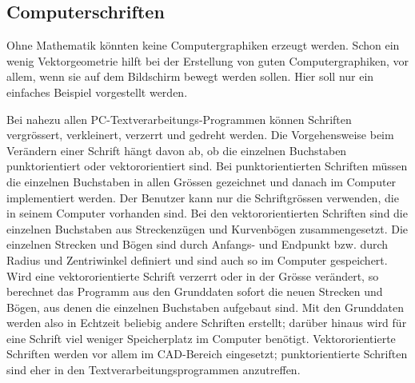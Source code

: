 \documentclass[%
11pt,%
twoside,%
titlepage,%
german,%
headsepline%
]{scrartcl}
\begin{document}
\subsection{Computerschriften}
Ohne Mathematik könnten keine Computergraphiken erzeugt werden. Schon ein wenig Vektorgeometrie hilft bei der Erstellung von guten Computergraphiken, vor allem, wenn sie auf dem Bildschirm bewegt werden sollen.
Hier soll nur ein einfaches Beispiel vorgestellt werden.

Bei nahezu allen PC-Textverarbeitungs-Programmen können Schriften vergrössert, verkleinert, verzerrt und gedreht werden. Die Vorgehensweise beim Verändern einer Schrift hängt davon ab, ob die einzelnen Buchstaben punktorientiert oder vektororientiert sind. Bei punktorientierten Schriften müssen die einzelnen Buchstaben in allen Grössen gezeichnet und danach im Computer implementiert werden. Der Benutzer kann nur die Schriftgrössen verwenden, die in seinem Computer vorhanden sind. Bei den vektororientierten Schriften sind die einzelnen Buchstaben aus Streckenzügen und Kurvenbögen zusammengesetzt. Die einzelnen Strecken und Bögen sind durch Anfangs- und Endpunkt bzw. durch Radius und Zentriwinkel definiert und sind auch so im Computer gespeichert. Wird eine vektororientierte Schrift verzerrt oder in der Grösse verändert, so berechnet das Programm aus den Grunddaten sofort die neuen Strecken und Bögen, aus denen die einzelnen Buchstaben aufgebaut sind. Mit den Grunddaten werden also in Echtzeit beliebig andere Schriften erstellt; darüber hinaus wird für eine Schrift viel weniger Speicherplatz im Computer benötigt. Vektororientierte Schriften werden vor allem im CAD-Bereich eingesetzt; punktorientierte Schriften sind eher in den Textverarbeitungsprogrammen anzutreffen.
\end{document}
